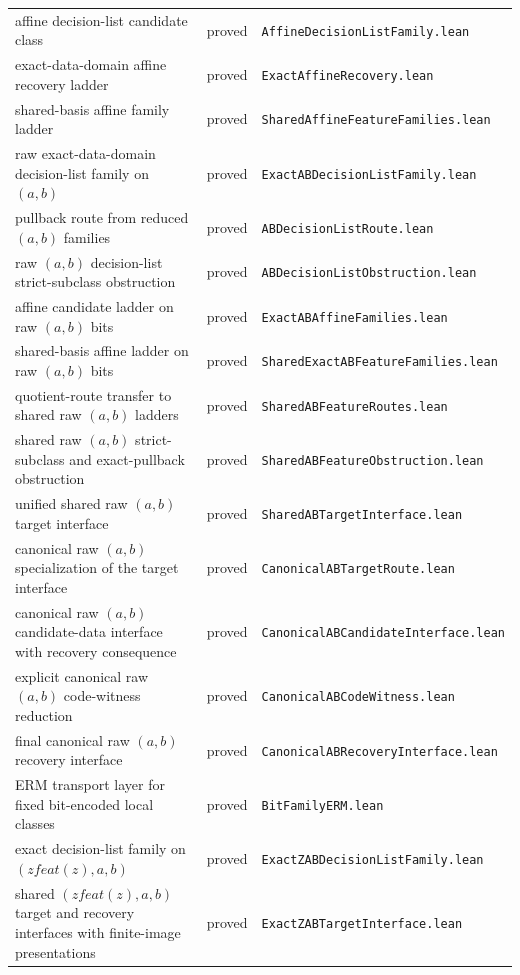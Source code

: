 \documentclass[11pt]{article}
\theoremstyle{remark}
\begin{document}
\begin{center}
\begin{tabular}{lll}
affine decision-list candidate class & proved & \texttt{AffineDecisionListFamily.lean} \\
exact-data-domain affine recovery ladder & proved & \texttt{ExactAffineRecovery.lean} \\
shared-basis affine family ladder & proved & \texttt{SharedAffineFeatureFamilies.lean} \\
raw exact-data-domain decision-list family on $(a,b)$ & proved & \texttt{ExactABDecisionListFamily.lean} \\
pullback route from reduced $(a,b)$ families & proved & \texttt{ABDecisionListRoute.lean} \\
raw $(a,b)$ decision-list strict-subclass obstruction & proved & \texttt{ABDecisionListObstruction.lean} \\
affine candidate ladder on raw $(a,b)$ bits & proved & \texttt{ExactABAffineFamilies.lean} \\
shared-basis affine ladder on raw $(a,b)$ bits & proved & \texttt{SharedExactABFeatureFamilies.lean} \\
quotient-route transfer to shared raw $(a,b)$ ladders & proved & \texttt{SharedABFeatureRoutes.lean} \\
shared raw $(a,b)$ strict-subclass and exact-pullback obstruction & proved & \texttt{SharedABFeatureObstruction.lean} \\
unified shared raw $(a,b)$ target interface & proved & \texttt{SharedABTargetInterface.lean} \\
canonical raw $(a,b)$ specialization of the target interface & proved & \texttt{CanonicalABTargetRoute.lean} \\
canonical raw $(a,b)$ candidate-data interface with recovery consequence & proved & \texttt{CanonicalABCandidateInterface.lean} \\
explicit canonical raw $(a,b)$ code-witness reduction & proved & \texttt{CanonicalABCodeWitness.lean} \\
final canonical raw $(a,b)$ recovery interface & proved & \texttt{CanonicalABRecoveryInterface.lean} \\
ERM transport layer for fixed bit-encoded local classes & proved & \texttt{BitFamilyERM.lean} \\
exact decision-list family on $(zfeat(z),a,b)$ & proved & \texttt{ExactZABDecisionListFamily.lean} \\
shared $(zfeat(z),a,b)$ target and recovery interfaces with finite-image presentations & proved & \texttt{ExactZABTargetInterface.lean} \\

\end{tabular}
\end{center}
\end{document}

